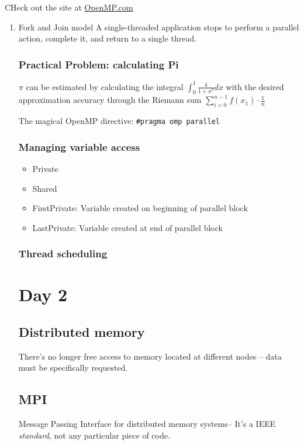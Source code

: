 \documentclass[11pt]{article}
\begin{document}
CHeck out the site at \href{http://www.openmp.com/}{OpenMP.com}


\begin{enumerate}
\item Fork and Join model
\label{sec-1-2-0-1}
A single-threaded application stops to perform a parallel action, complete it, and return to a single thread.

\subsubsection{Practical Problem: calculating Pi}
\label{sec-1-2-1}

$\pi$ can be estimated by calculating the integral $\int_0^1 \frac{4}{1+x^2}dx$ with the desired approximation accuracy through the Riemann sum $\sum_{i=0}^{n-1}f(x_1)\cdot\frac{1}{n}$

The magical OpenMP directive: \texttt{\#pragma omp parallel}



\subsubsection{Managing variable access}
\label{sec-1-2-2}
\begin{itemize}
\item Private
\item Shared
\item FirstPrivate: Variable created on beginning of parallel block
\item LastPrivate: Variable created at end of parallel block
\end{itemize}
\subsubsection{Thread scheduling}
\label{sec-1-2-3}
\section{Day 2}
\label{sec-2}
\subsection{Distributed memory}
\label{sec-2-1}
There's  no longer free access to memory located at different nodes -- data must be specifically requested.
\subsection{MPI}
\label{sec-2-2}
Message Passing Interface for distributed memory systems-- It's a IEEE \emph{standard}, not any particular piece of code.

\end{enumerate}
\end{document}
